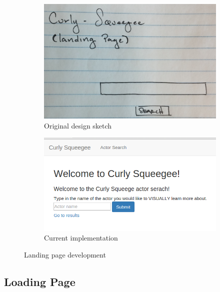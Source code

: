 \documentclass[12pt]{article}
\begin{document}
	\begin{figure}[h!]
		\centering
		\begin{subfigure}[t]{.5\textwidth}
			  \centering
			  \includegraphics[width=\linewidth]{images/landingPage_crop.png}
			  \caption{Original design sketch}
			  \label{fig:sub1}
		\end{subfigure}%
		\begin{subfigure}[t]{.8\textwidth}
			  \centering
			  \includegraphics[width=0.75\linewidth]{images/landingPage.png}
			  \caption{Current implementation}
			  \label{fig:sub2}
		\end{subfigure}%
		\caption{Landing page development}
		\label{fig:landingPage}
	\end{figure}


\subsection{Loading Page}
\end{document}

